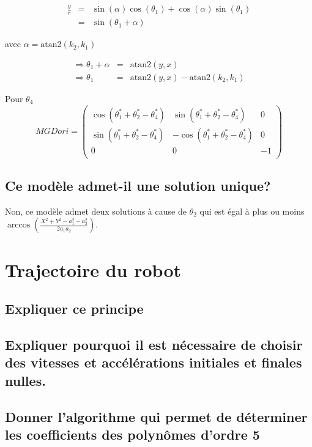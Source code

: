 \documentclass[]{article}
\begin{document}
\[
\begin{array}{lcl} 
  \frac{y}{r} & = & \sin(\alpha)\cos(\theta_1)+\cos(\alpha)\sin(\theta_1)\\
  & = & \sin(\theta_1+\alpha)
\end{array}
\]

avec $\alpha = \mathrm{atan2}(k_2,k_1)$

\[
\begin{array}{lcl} 
  \Rightarrow \theta_1 + \alpha & = & \mathrm{atan2}(y,x)\\
  \Rightarrow \theta_1 & = & \mathrm{atan2}(y,x) - \mathrm{atan2}(k_2,k_1)
\end{array}
\]


Pour $\theta_4$
\[ 
  MGDori =
  \begin{pmatrix}
    \cos (\theta^*_1+\theta^*_2-\theta^*_4) & \sin (\theta^*_1+\theta^*_2-\theta^*_4) & 0 \\
    \sin (\theta^*_1+\theta^*_2-\theta^*_4) & -\cos (\theta^*_1+\theta^*_2-\theta^*_4) & 0 \\
    0 & 0 & -1\\
  \end{pmatrix}
\]

\subsection{Ce modèle admet-il une solution unique?}

Non, ce modèle admet deux solutions à cause de $\theta_2$ qui est égal à plus ou moins $\arccos(\frac{X^2+Y^2-a_1^2-a_2^2}{2 a_1 a_2})$.

\section{Trajectoire du robot}

\subsection{Expliquer ce principe}



\subsection{Expliquer pourquoi il est nécessaire de choisir des vitesses
et accélérations initiales et finales nulles.}

\subsection{Donner l'algorithme qui permet de déterminer les
coefficients des polynômes d'ordre 5}
\end{document}
